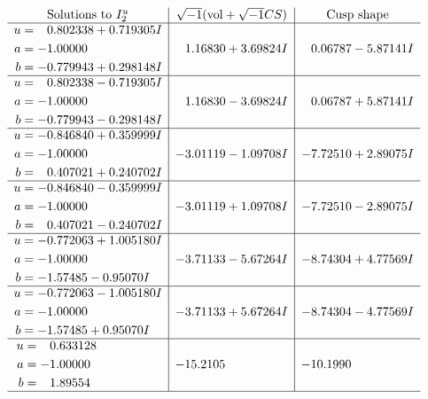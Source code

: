 \documentclass[1p]{elsarticle_modified}
\theoremstyle{definition}
\newcommand{\I}{\sqrt{-1}}
\begin{document}
$$\begin{array}{c|c|c}  
\text{Solutions to }I^u_{2}& \I (\text{vol} + \sqrt{-1}CS) & \text{Cusp shape}\\
 \hline 
\begin{aligned}
u &= \phantom{-}0.802338 + 0.719305 I \\
a &= -1.00000\phantom{ +0.000000I} \\
b &= -0.779943 + 0.298148 I\end{aligned}
 & \phantom{-}1.16830 + 3.69824 I & \phantom{-}0.06787 - 5.87141 I \\ \hline\begin{aligned}
u &= \phantom{-}0.802338 - 0.719305 I \\
a &= -1.00000\phantom{ +0.000000I} \\
b &= -0.779943 - 0.298148 I\end{aligned}
 & \phantom{-}1.16830 - 3.69824 I & \phantom{-}0.06787 + 5.87141 I \\ \hline\begin{aligned}
u &= -0.846840 + 0.359999 I \\
a &= -1.00000\phantom{ +0.000000I} \\
b &= \phantom{-}0.407021 + 0.240702 I\end{aligned}
 & -3.01119 - 1.09708 I & -7.72510 + 2.89075 I \\ \hline\begin{aligned}
u &= -0.846840 - 0.359999 I \\
a &= -1.00000\phantom{ +0.000000I} \\
b &= \phantom{-}0.407021 - 0.240702 I\end{aligned}
 & -3.01119 + 1.09708 I & -7.72510 - 2.89075 I \\ \hline\begin{aligned}
u &= -0.772063 + 1.005180 I \\
a &= -1.00000\phantom{ +0.000000I} \\
b &= -1.57485 - 0.95070 I\end{aligned}
 & -3.71133 - 5.67264 I & -8.74304 + 4.77569 I \\ \hline\begin{aligned}
u &= -0.772063 - 1.005180 I \\
a &= -1.00000\phantom{ +0.000000I} \\
b &= -1.57485 + 0.95070 I\end{aligned}
 & -3.71133 + 5.67264 I & -8.74304 - 4.77569 I \\ \hline\begin{aligned}
u &= \phantom{-}0.633128\phantom{ +0.000000I} \\
a &= -1.00000\phantom{ +0.000000I} \\
b &= \phantom{-}1.89554\phantom{ +0.000000I}\end{aligned}
 & -15.2105\phantom{ +0.000000I} & -10.1990\phantom{ +0.000000I}\\
 \hline 
 \end{array}$$\newpage\newpage\renewcommand{\arraystretch}{1}
\end{document}
